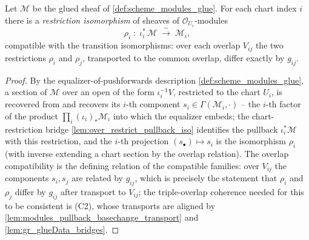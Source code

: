 \begin{definition}
  \label{def:gr_modules_glueRestrictionIso}
  Let \(\mathcal{M}\) be the glued sheaf of \cref{def:scheme_modules_glue}. For each
  chart index \(i\) there is a \emph{restriction isomorphism} of sheaves of
  \(\mathcal{O}_{U_i}\)-modules
  \[
    \rho_i \;:\; \iota_i^{*}\,\mathcal{M} \;\xrightarrow{\ \sim\ }\; \mathcal{M}_i,
  \]
  compatible with the transition isomorphisms: over each overlap \(V_{ij}\) the two
  restrictions \(\rho_i\) and \(\rho_j\), transported to the common overlap, differ
  exactly by \(g_{ij}\).
\end{definition}
\begin{proof}
  By the equalizer-of-pushforwards description \cref{def:scheme_modules_glue}, a section of
  \(\mathcal{M}\) over an open of the form \(\iota_i^{-1}V\), restricted to the chart
  \(U_i\), is recovered from and recovers its \(i\)-th component
  \(s_i \in \Gamma(\mathcal{M}_i, \cdot)\) -- the \(i\)-th factor of the product
  \(\prod_i (\iota_i)_{*}\mathcal{M}_i\) into which the equalizer embeds; the
  chart-restriction bridge \cref{lem:over_restrict_pullback_iso} identifies the pullback
  \(\iota_i^{*}\mathcal{M}\) with this restriction, and the \(i\)-th projection
  \((s_\bullet) \mapsto s_i\) is the isomorphism \(\rho_i\) (with inverse extending a chart
  section by the overlap relation).
  The overlap compatibility is the defining relation of the compatible families: over
  \(V_{ij}\) the components \(s_i, s_j\) are related by \(g_{ij}\), which is precisely the
  statement that \(\rho_i\) and \(\rho_j\) differ by \(g_{ij}\) after transport to
  \(V_{ij}\); the triple-overlap coherence needed for this to be consistent is (C2),
  whose transports are aligned by \cref{lem:modules_pullback_basechange_transport} and
  \cref{lem:gr_glueData_bridges}.
\end{proof}


